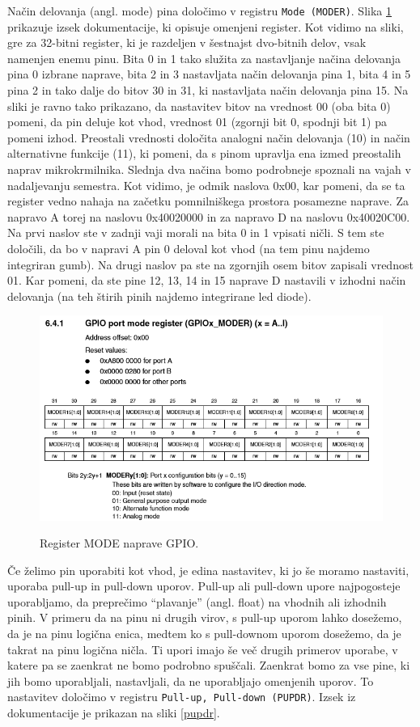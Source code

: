 \documentclass[12pt,letterpaper]{article}
\begin{document}
Način delovanja (angl. mode) pina določimo v registru \texttt{Mode (MODER)}. Slika \ref{moder} prikazuje izsek dokumentacije, ki opisuje omenjeni register. Kot vidimo na sliki, gre za 32-bitni register, ki je razdeljen v šestnajst dvo-bitnih delov, vsak namenjen enemu pinu. Bita 0 in 1 tako služita za nastavljanje načina delovanja pina 0 izbrane naprave, bita 2 in 3 nastavljata način delovanja pina 1, bita 4 in 5 pina 2 in tako dalje do bitov 30 in 31, ki nastavljata način delovanja pina 15. Na sliki je ravno tako prikazano, da nastavitev bitov na vrednost 00 (oba bita 0) pomeni, da pin deluje kot vhod, vrednost 01 (zgornji bit 0, spodnji bit 1) pa pomeni izhod. Preostali vrednosti določita analogni način delovanja (10) in način alternativne funkcije (11), ki pomeni, da s pinom upravlja ena izmed preostalih naprav mikrokrmilnika. Slednja dva načina bomo podrobneje spoznali na vajah v nadaljevanju semestra. Kot vidimo, je odmik naslova 0x00, kar pomeni, da se ta register vedno nahaja na začetku pomnilniškega prostora posamezne naprave. Za napravo A torej na naslovu 0x40020000 in za napravo D na naslovu 0x40020C00. Na prvi naslov ste v zadnji vaji morali na bita 0 in 1 vpisati ničli. S tem ste določili, da bo v napravi A pin 0 deloval kot vhod (na tem pinu najdemo integriran gumb). Na drugi naslov pa ste na zgornjih osem bitov zapisali vrednost 01. Kar pomeni, da ste pine 12, 13, 14 in 15 naprave D nastavili v izhodni način delovanja (na teh štirih pinih najdemo integrirane led diode).

\begin{figure}[ht!]
  \centering
  \caption{Register MODE naprave GPIO.}
  \includegraphics[width=350pt]{images/vaja3/moder.png}
  \label{moder}
\end{figure}

Če želimo pin uporabiti kot vhod, je edina nastavitev, ki jo še moramo nastaviti, uporaba pull-up in pull-down uporov. Pull-up ali pull-down upore najpogosteje uporabljamo, da preprečimo ``plavanje'' (angl. float) na vhodnih ali izhodnih pinih. V primeru da na pinu ni drugih virov, s pull-up uporom lahko dosežemo, da je na pinu logična enica, medtem ko s pull-downom uporom dosežemo, da je takrat na pinu logična ničla. Ti upori imajo še več drugih primerov uporabe, v katere pa se zaenkrat ne bomo podrobno spuščali. Zaenkrat bomo za vse pine, ki jih bomo uporabljali, nastavljali, da ne uporabljajo omenjenih uporov. To nastavitev določimo v registru \texttt{Pull-up, Pull-down (PUPDR)}. Izsek iz dokumentacije je prikazan na sliki \ref{pupdr}.
\end{document}
